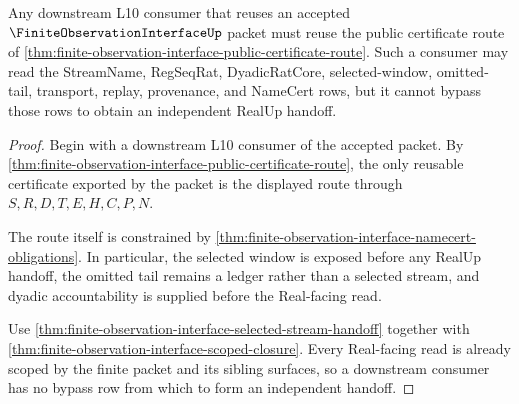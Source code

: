 \begin{theorem}
\label{thm:finite-observation-interface-consumer-reuse}
Any downstream L10 consumer that reuses an accepted $\FiniteObservationInterfaceUp$ packet must reuse the public certificate route of \autoref{thm:finite-observation-interface-public-certificate-route}. Such a consumer may read the StreamName, RegSeqRat, DyadicRatCore, selected-window, omitted-tail, transport, replay, provenance, and NameCert rows, but it cannot bypass those rows to obtain an independent RealUp handoff.
\end{theorem}
\begin{proof}
Begin with a downstream L10 consumer of the accepted packet. By \autoref{thm:finite-observation-interface-public-certificate-route}, the only reusable certificate exported by the packet is the displayed route through $S,R,D,T,E,H,C,P,N$.

The route itself is constrained by \autoref{thm:finite-observation-interface-namecert-obligations}. In particular, the selected window is exposed before any RealUp handoff, the omitted tail remains a ledger rather than a selected stream, and dyadic accountability is supplied before the Real-facing read.

Use \autoref{thm:finite-observation-interface-selected-stream-handoff} together with \autoref{thm:finite-observation-interface-scoped-closure}. Every Real-facing read is already scoped by the finite packet and its sibling surfaces, so a downstream consumer has no bypass row from which to form an independent handoff.
\end{proof}


